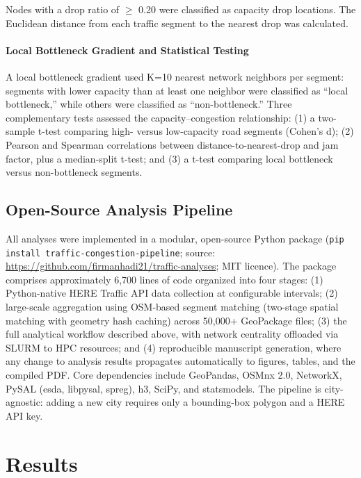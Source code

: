 \documentclass[12pt,a4paper]{article}
\begin{document}
Nodes with a drop ratio of  $\geq$ 0.20 were classified as capacity drop locations. The Euclidean distance from each traffic segment to the nearest drop was calculated.

\paragraph{Local Bottleneck Gradient and Statistical Testing}

A local bottleneck gradient used K=10 nearest network neighbors per segment: segments with lower capacity than at least one neighbor were classified as ``local bottleneck,'' while others were classified as ``non-bottleneck.'' Three complementary tests assessed the capacity--congestion relationship: (1) a two-sample t-test comparing high- versus low-capacity road segments (Cohen's d); (2) Pearson and Spearman correlations between distance-to-nearest-drop and jam factor, plus a median-split t-test; and (3) a t-test comparing local bottleneck versus non-bottleneck segments.

\subsection{Open-Source Analysis Pipeline}

All analyses were implemented in a modular, open-source Python package (\texttt{pip install traffic-congestion-pipeline}; source: \url{https://github.com/firmanhadi21/traffic-analyses}; MIT licence). The package comprises approximately 6,700 lines of code organized into four stages: (1) Python-native HERE Traffic API data collection at configurable intervals; (2) large-scale aggregation using OSM-based segment matching (two-stage spatial matching with geometry hash caching) across 50,000+ GeoPackage files; (3) the full analytical workflow described above, with network centrality offloaded via SLURM to HPC resources; and (4) reproducible manuscript generation, where any change to analysis results propagates automatically to figures, tables, and the compiled PDF. Core dependencies include GeoPandas, OSMnx 2.0, NetworkX, PySAL (esda, libpysal, spreg), h3, SciPy, and statsmodels. The pipeline is city-agnostic: adding a new city requires only a bounding-box polygon and a HERE API key.



\section{Results}
\end{document}
